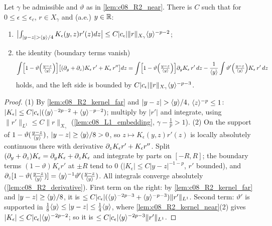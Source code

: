 \begin{lemma}
  \label{lem:c08_R2_far}
  Let $\gamma$ be admissible and $\vartheta$ as in \cref{lem:c08_R2_near}. There is $C$ such that for
  $0\le\epsilon\le\epsilon_c$, $r\in X_\gamma$ and (a.e.) $y\in\mathbb{R}$:
  \begin{enumerate}
    \item $\bigl|\int_{|y-z|>\ang{y}/4}K_\epsilon(y,z)r'(z)dz\bigr|\le C|c_\epsilon|\|r\|_{X_\gamma}\ang{y}^{-p-2}$;
    \item the identity (boundary terms vanish)
      \begin{equation}\label{eqn:linear_R2_far_derivative_ibp}
        \int\Bigl[1-\vartheta\Bigl(\tfrac{y-z}{\langle y \rangle}\Bigr)\Bigr]\bigl[(\partial_y+\partial_z)K_\epsilon\,r'+K_\epsilon\,r''\bigr]dz
        =\int\Bigl[1-\vartheta\Bigl(\tfrac{y-z}{\langle y \rangle}\Bigr)\Bigr]\partial_yK_\epsilon\,r'\,dz-\frac1{\langle y \rangle}\int\vartheta'\Bigl(\tfrac{y-z}{\langle y \rangle}\Bigr)K_\epsilon\,r'\,dz
      \end{equation}
      holds, and the left side is bounded by $C|c_\epsilon|\|r\|_{X_\gamma}\langle y \rangle^{-p-3}$.
  \end{enumerate}
\end{lemma}
\begin{proof}
  (1) By \cref{lem:c08_R2_kernel_far} and $|y-z|>\ang{y}/4$, $\langle z \rangle^{-p}\le1$:
  $|K_\epsilon|\le C|c_\epsilon|(\langle y \rangle^{-2p-2}+\langle y \rangle^{-p-2})$; multiply by $|r'|$ and integrate, using
  $\|r'\|_{L^1}\le C\|r\|_{X_\gamma}$ (\cref{lem:c08_L1_embedding}, $\gamma-\frac1p>1$).
  (2) On the support of $1-\vartheta(\frac{y-z}{\langle y \rangle})$, $|y-z|\ge\langle y \rangle/8>0$, so $z\mapsto K_\epsilon(y,z)r'(z)$ is locally
  absolutely continuous there with derivative $\partial_zK_\epsilon r'+K_\epsilon r''$. Split
  $(\partial_y+\partial_z)K_\epsilon=\partial_yK_\epsilon+\partial_zK_\epsilon$ and integrate by parts on $[-R,R]$; the boundary terms
  $(1-\vartheta)K_\epsilon r'$ at $\pm R$ tend to $0$ ($|K_\epsilon|\le C|y-z|^{-1-p}$, $r'$ bounded), and
  $\partial_z[1-\vartheta(\frac{y-z}{\langle y \rangle})]=\langle y \rangle^{-1}\vartheta'(\frac{y-z}{\langle y \rangle})$. All integrals converge absolutely
  (\cref{lem:c08_R2_derivative}). First term on the right: by \cref{lem:c08_R2_kernel_far} and
  $|y-z|\ge\langle y \rangle/8$, it is $\le C|c_\epsilon|(\langle y \rangle^{-2p-3}+\langle y \rangle^{-p-3})\|r'\|_{L^1}$. Second term: $\vartheta'$ is
  supported in $\frac18\langle y \rangle\le|y-z|\le\frac14\langle y \rangle$, where \cref{lem:c08_R2_kernel_near}(2) gives
  $|K_\epsilon|\le C|c_\epsilon|\langle y \rangle^{-2p-2}$; so it is $\le C|c_\epsilon|\langle y \rangle^{-2p-3}\|r'\|_{L^1}$.
\end{proof}

